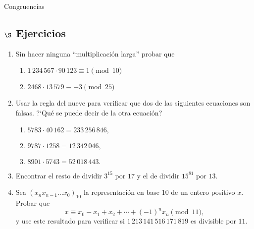 \begin{section}{Congruencias}




\subsection*{\Large $\S$ Ejercicios}
\begin{enumerate}
\item Sin hacer ninguna ``multiplicación larga'' probar que
\begin{enumerate}
	\item $1\,234\,567 \cdot 90\,123 \equiv 1 \pmod{10}$
	
	\item $2468 \cdot 13\,579 \equiv -3 \pmod{25}$
\end{enumerate}
\item Usar la regla del nueve para verificar que dos de las siguientes ecuaciones son falsas. ?`Qué se puede decir de la otra ecuación?
\begin{enumerate}
	\item  $5783 \cdot 40\,162  = 233\,256\,846 ,$
	
	\item  $9787 \cdot 1258  = 12\,342\,046 , $
	
	\item  $ 8901 \cdot 5743  = 52\,018\,443 .$
\end{enumerate}
\item Encontrar el resto de dividir $3^{15}$ por $17$ y el de dividir $15^{81}$ por $13$.
\item  Sea $(x_nx_{n-1}\ldots x_0)_{10}$ la representación en base 10 de un entero positivo $x$. Probar que
$$
x\equiv x_0-x_1+x_2+\cdots +(-1)^nx_n \pmod{11},
$$
y use este resultado para verificar si $1\,213\,141\,516\,171\,819$
es divisible por $11$.
\end{enumerate}
\end{section}


